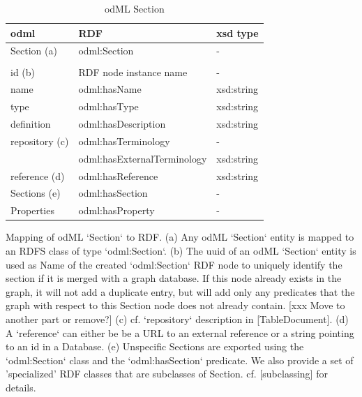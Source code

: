 \documentclass{article}
\begin{document}
\begin{table}
\begin{threeparttable}
\caption{odML Section}
\begin{tabular}{l|l|l}
    odml            & RDF                             & xsd type \\
\hline
    Section (a)     & odml:Section                    & - \\
                    & & \\
    id (b)          & RDF node instance name          & - \\
    name            & odml:hasName                    & xsd:string \\
    type            & odml:hasType                    & xsd:string \\
    definition      & odml:hasDescription             & xsd:string \\
    repository (c)  & odml:hasTerminology             & - \\
                    & odml:hasExternalTerminology     & xsd:string \\
    reference (d)   & odml:hasReference               & xsd:string \\
    Sections (e)    & odml:hasSection                 & - \\
    Properties      & odml:hasProperty                & - \\

\end{tabular}
\begin{tablenotes}
\item Mapping of odML `Section` to RDF. (a) Any odML `Section` entity is mapped to an RDFS class of type `odml:Section`. (b) The uuid of an odML `Section` entity is used as Name of the created `odml:Section` RDF node to uniquely identify the section if it is merged with a graph database. If this node already exists in the graph, it will not add a duplicate entry, but will add only any predicates that the graph with respect to this Section node does not already contain. [xxx Move to another part or remove?] (c) cf. `repository` description in [TableDocument]. (d) A `reference` can either be be a URL to an external reference or a string pointing to an id in a Database. (e) Unspecific Sections are exported using the `odml:Section` class and the `odml:hasSection` predicate. We also provide a set of 'specialized' RDF classes that are subclasses of Section. cf. [subclassing] for details.
\end{tablenotes}
\end{threeparttable}
\end{table}
\end{document}

